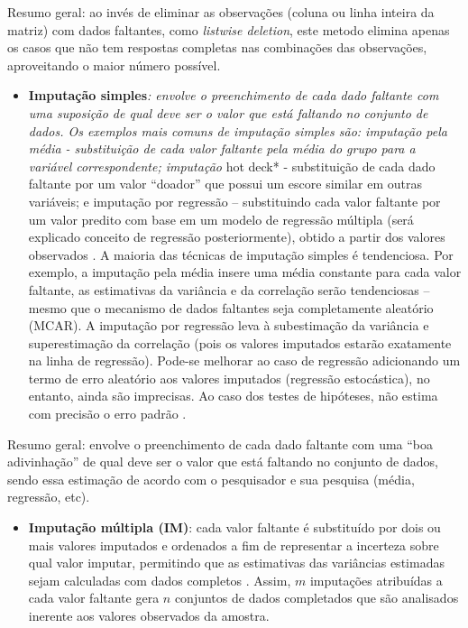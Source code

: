 \documentclass[
]{book}
\providecommand{\tightlist}{%
  \setlength{\itemsep}{0pt}\setlength{\parskip}{0pt}}
\begin{document}
Resumo geral: ao invés de eliminar as observações (coluna ou linha inteira da matriz) com dados faltantes, como \emph{listwise deletion}, este metodo elimina apenas os casos que não tem respostas completas nas combinações das observações, aproveitando o maior número possível.

\begin{itemize}
\tightlist
\item
  \textbf{Imputação simples}\emph{: envolve o preenchimento de cada dado
  faltante com uma suposição de qual deve ser o valor que está
  faltando no conjunto de dados. Os exemplos mais comuns de imputação simples são: imputação pela média - substituição de cada valor faltante pela média do grupo para a variável correspondente; imputação }hot deck* - substituição de cada dado faltante por um valor ``doador'' que possui um escore similar em outras variáveis; e imputação por regressão -- substituindo cada valor faltante por um valor predito com base em um modelo de regressão múltipla (será explicado conceito de regressão posteriormente), obtido a partir dos valores observados \citep{tecnicasinput}. A maioria das técnicas de imputação simples é tendenciosa. Por exemplo, a imputação pela média insere uma média constante para cada valor faltante, as estimativas da variância e da correlação serão tendenciosas -- mesmo que o mecanismo de dados faltantes seja completamente aleatório (MCAR). A imputação por regressão leva à subestimação da variância e superestimação da correlação (pois os valores imputados estarão exatamente na linha de regressão). Pode-se melhorar ao caso de regressão adicionando um termo de erro aleatório aos valores imputados (regressão estocástica), no entanto, ainda são imprecisas. Ao caso dos testes de hipóteses, não estima com precisão o erro padrão \citep{tecnicasinput}.
\end{itemize}

Resumo geral: envolve o preenchimento de cada dado faltante com uma ``boa adivinhação'' de qual deve ser o valor que está faltando no conjunto de dados, sendo essa estimação de acordo com o pesquisador e sua pesquisa (média, regressão, etc).

\begin{itemize}
\tightlist
\item
  \textbf{Imputação múltipla (IM)}: cada valor faltante é substituído por dois ou mais valores imputados e ordenados a fim de representar a incerteza sobre qual valor imputar, permitindo que as estimativas das variâncias estimadas sejam calculadas com dados completos \citep{rubin2004multiple}. Assim, \(m\) imputações atribuídas a cada valor faltante gera \(n\) conjuntos de dados completados que são analisados inerente aos valores observados da amostra.
\end{itemize}
\end{document}
